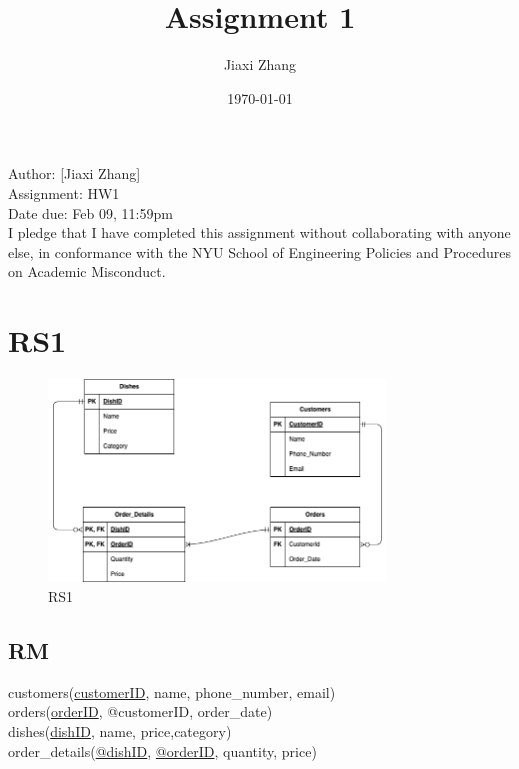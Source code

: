 \documentclass{article}
\title{Assignment 1}
\author{Jiaxi Zhang}
\date{\today}
\begin{document}
\maketitle
\begin{CJK*}{UTF8}{gbsn}
    \begin{flushleft}
    Author: [Jiaxi Zhang]
    \\Assignment: HW1 
    \\Date due: Feb 09, 11:59pm 
    \\I pledge that I have completed this assignment without collaborating with anyone else, in conformance with the NYU School of Engineering Policies and Procedures on Academic Misconduct.
    \end{flushleft}

    \section{RS1}
    \begin{figure}[H]
        \centering
        \includegraphics[width=0.8\textwidth]{RS1.png}
        \caption{RS1}
    \end{figure}
    \subsection{RM}
    customers(\underline{customerID}, name, phone\_number, email)
    \\orders(\underline{orderID}, @customerID, order\_date)
    \\dishes(\underline{dishID}, name, price,category)
    \\order\_details(\underline{@dishID}, \underline{@orderID}, quantity, price)


\end{CJK*}
\end{document}
